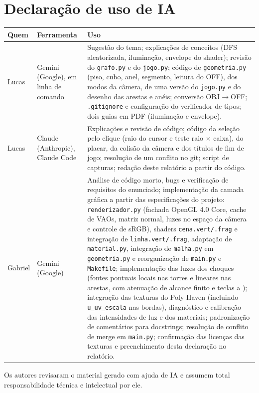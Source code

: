 \documentclass[a4paper,11pt]{article}
\newcommand{\tecla}[1]{\fbox{\footnotesize\ttfamily #1}}
\newcommand{\arq}[1]{\texttt{#1}}
\begin{document}
\section{Declaração de uso de IA}
\begin{table}[H]
\centering\small
\begin{tabularx}{\linewidth}{@{}llY@{}}
\toprule
\textbf{Quem} & \textbf{Ferramenta} & \textbf{Uso} \\
\midrule
Lucas & Gemini (Google), em linha de comando &
Sugestão do tema; explicações de conceitos (DFS aleatorizada, iluminação,
envelope do shader); revisão do \arq{grafo.py} e do \arq{jogo.py}; código de
\arq{geometria.py} (piso, cubo, anel, segmento, leitura do OFF), dos modos da
câmera, de uma versão do \arq{jogo.py} e do desenho das arestas e anéis; conversão OBJ$\to$OFF;
\arq{.gitignore} e configuração do verificador de tipos; dois guias em PDF
(iluminação e envelope). \\
Lucas & Claude (Anthropic), Claude Code &
Explicações e revisão de código; código da seleção pelo clique (raio do cursor
e teste raio $\times$ caixa), do placar, da colisão da câmera e dos títulos de
fim de jogo; resolução de um conflito no git; script de capturas; redação deste
relatório a partir do código. \\
Gabriel & Gemini (Google) &
Análise de código morto, bugs e verificação de requisitos do enunciado;
implementação da camada gráfica a partir das especificações do projeto:
\arq{renderizador.py} (fachada OpenGL 4.0 Core, cache de VAOs, matriz normal,
luzes no espaço da câmera e controle de sRGB), shaders \arq{cena.vert/.frag} e
integração de \arq{linha.vert/.frag}, adaptação de \arq{material.py}, integração
de \arq{malha.py} em \arq{geometria.py} e reorganização de \arq{main.py} e
\arq{Makefile}; implementação das luzes dos choques (fontes pontuais locais nas
torres e lineares nas arestas, com atenuação de alcance finito e teclas
\tecla{3} a \tecla{5}); integração das texturas do Poly Haven (incluindo
\texttt{u\_uv\_escala} nas bordas), diagnóstico e calibração das intensidades de
luz e dos materiais; padronização de comentários para docstrings; resolução de
conflito de merge em \arq{main.py}; confirmação das licenças das texturas e
preenchimento desta declaração no relatório. \\
\bottomrule
\end{tabularx}
\end{table}

Os autores revisaram o material gerado com ajuda de IA e assumem total
responsabilidade técnica e intelectual por ele.
\end{document}
